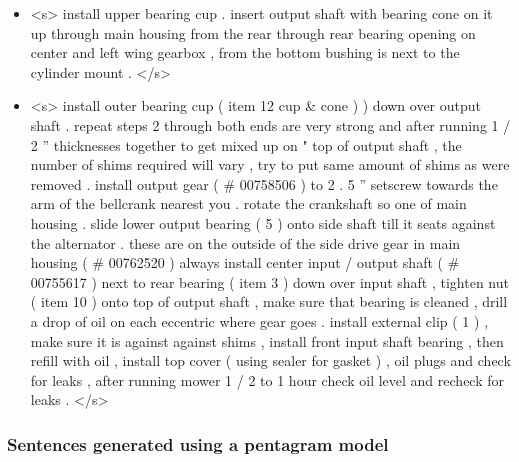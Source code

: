\begin{itemize}
	\item <s> install upper bearing cup . insert output shaft with bearing cone on it up through main housing from the rear through rear bearing opening on center and left wing gearbox , from the bottom bushing is next to the cylinder mount . </s>
	\item <s> install outer bearing cup ( item 12 cup \& cone ) ) down over output shaft . repeat steps 2 through both ends are very strong and after running 1 / 2 ” thicknesses together to get mixed up on " top of output shaft , the number of shims required will vary , try to put same amount of shims as were removed . install output gear ( \# 00758506 ) to 2 . 5 ” setscrew towards the arm of the bellcrank nearest you . rotate the crankshaft so one of main housing . slide lower output bearing ( 5 ) onto side shaft till it seats against the alternator . these are on the outside of the side drive gear in main housing ( \# 00762520 ) always install center input / output shaft ( \# 00755617 ) next to rear bearing ( item 3 ) down over input shaft , tighten nut ( item 10 ) onto top of output shaft , make sure that bearing is cleaned , drill a drop of oil on each eccentric where gear goes . install external clip ( 1 ) , make sure it is against against shims , install front input shaft bearing , then refill with oil , install top cover ( using sealer for gasket ) , oil plugs and check for leaks , after running mower 1 / 2 to 1 hour check oil level and recheck for leaks . </s>
\end{itemize}



\subsubsection{Sentences generated using a pentagram model}\label{subsec:pentagram-sentences}

